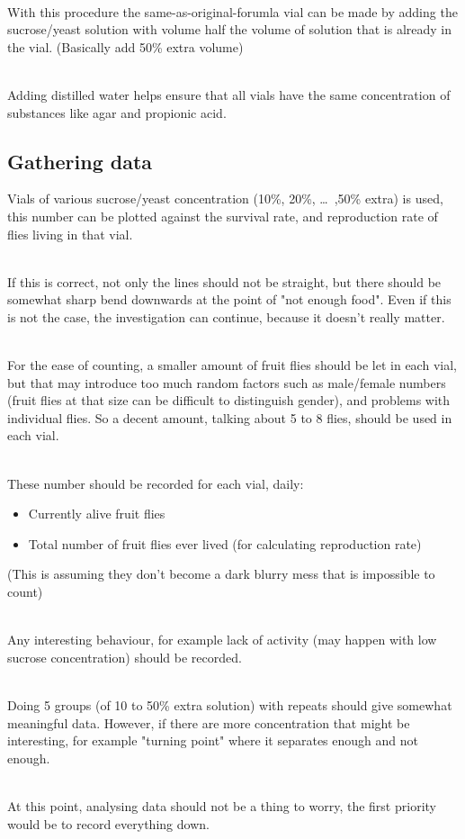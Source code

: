 \documentclass{article}
\begin{document}
\noindent\\
With this procedure the same-as-original-forumla vial can be made by adding the sucrose/yeast solution with volume half the volume of solution that is already in the vial. (Basically add 50\% extra volume)

\noindent\\
Adding distilled water helps ensure that all vials have the same concentration of substances like agar and propionic acid.

\subsection{Gathering data}

Vials of various sucrose/yeast concentration (10\%, 20\%, \dots~,50\% extra) is used, this number can be plotted against the survival rate, and reproduction rate of flies living in that vial.

\noindent\\
If this is correct, not only the lines should not be straight, but there should be somewhat sharp bend downwards at the point of "not enough food". Even if this is not the case, the investigation can continue, because it doesn't really matter.

\noindent\\
For the ease of counting, a smaller amount of fruit flies should be let in each vial, but that may introduce too much random factors such as male/female numbers (fruit flies at that size can be difficult to distinguish gender), and problems with individual flies. So a decent amount, talking about 5 to 8 flies, should be used in each vial.

\noindent\\
These number should be recorded for each vial, daily:

\begin{itemize}
  \item Currently alive fruit flies
  \item Total number of fruit flies ever lived (for calculating reproduction rate)
\end{itemize}

\noindent
(This is assuming they don't become a dark blurry mess that is impossible to count)

\noindent\\
Any interesting behaviour, for example lack of activity (may happen with low sucrose concentration) should be recorded.

\noindent\\
Doing 5 groups (of 10 to 50\% extra solution) with repeats should give somewhat meaningful data. However, if there are more concentration that might be interesting, for example "turning point" where it separates enough and not enough.

\noindent\\
At this point, analysing data should not be a thing to worry, the first priority would be to record everything down.
\end{document}
